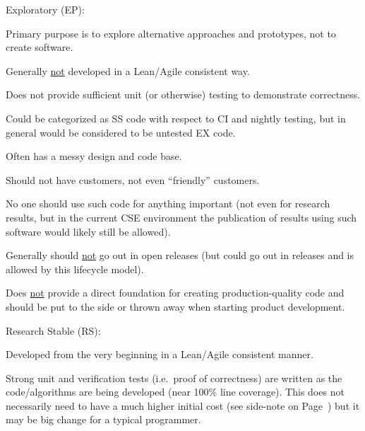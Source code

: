 \documentclass[11pt]{SANDreport}
\begin{document}
\begin{compactenum}

{}\item Exploratory (EP):

\begin{compactitem}

{}\item Primary purpose is to explore alternative approaches and
prototypes, not to create software.

{}\item Generally {}\underline{not} developed in a Lean/Agile
consistent way.

{}\item Does not provide sufficient unit (or otherwise) testing to
demonstrate correctness.

{}\item Could be categorized as SS code with respect to CI
and nightly testing, but in general would be considered to be untested
EX code.

{}\item Often has a messy design and code base.

{}\item Should not have  customers, not even ``friendly'' customers.

{}\item No one should use such code for anything important (not even
for research results, but in the current CSE environment the
publication of results using such software would likely still be
allowed).

{}\item Generally should {}\underline{not} go out in open releases
(but could go out in releases and is allowed by this lifecycle model).

{}\item Does {}\underline{not} provide a direct foundation for
creating production-quality code and should be put to the side or
thrown away when starting product development.

\end{compactitem}

{}\item Research Stable (RS):

\begin{compactitem}

{}\item Developed from the very beginning in a Lean/Agile consistent
manner.

{}\item Strong unit and verification tests (i.e.\ proof of
correctness) are written as the code/algorithms are being developed
(near 100\% line coverage).  This does not necessarily need to have a
much higher initial cost (see side-note on
Page~\pageref{levels_of_unit_testing}) but it may be big change for a
typical programmer.


\end{compactitem}
\end{compactenum}
\end{document}
